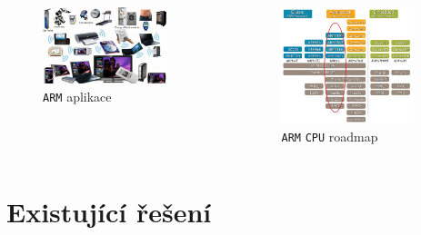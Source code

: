 \documentclass[compress]{beamer}
\begin{document}
\begin{frame}
	\begin{columns}
			\begin{figure}
			\centering
			\includegraphics[width=0.85\textwidth]{img/arm_powered_products.jpg}
			\caption{\texttt{ARM} aplikace}
			\label{ARM aplikace}
		\end{figure}
			\begin{figure}
			\centering
			\includegraphics[width=0.9\textwidth]{img/arm_processor_roadmap2.jpeg}
			\caption{\texttt{ARM} \texttt{CPU} roadmap}
			\label{ARM CPU roadmap}
		\end{figure}
	\end{columns}
\end{frame}

\section{Existující řešení}
\end{document}
